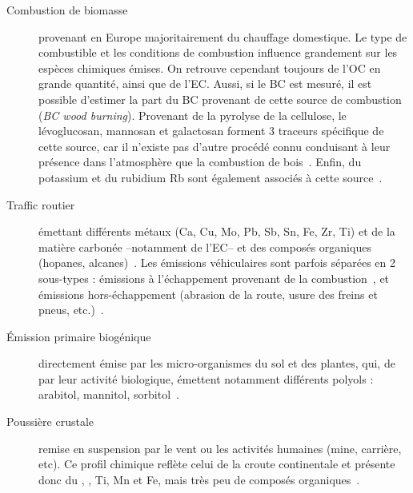 \begin{description}
    \item[Combustion de biomasse] provenant en Europe majoritairement du chauffage
        domestique. Le type de combustible et les conditions de combustion influence
        grandement sur les espèces chimiques émises. On retrouve cependant toujours de
        l'OC en grande quantité, ainsi que de l'EC. Aussi, si le BC est mesuré, il est
        possible d'estimer la part du BC provenant de cette source de combustion \BCwb{}
        (\textit{BC wood burning}).
        Provenant de la pyrolyse de la cellulose, le lévoglucosan, mannosan et
        galactosan forment 3 traceurs spécifique de cette source, car il n'existe pas d'autre
        procédé connu conduisant à leur présence dans l'atmosphère que la combustion de
        bois~\autocite{jordanLevoglucosan2006,puxbaumLevoglucosan2007}.
        Enfin, du potassium  et du rubidium Rb sont également associés à cette
        source~\autocite{navaBiomass2015,gollyEtude2014,chevrierChauffage2016}.

    \item[Traffic routier] émettant différents métaux (Ca, Cu, Mo, Pb, Sb, Sn, Fe, Zr,
        Ti) et de la matière carbonée --notamment de l'EC-- et des composés organiques
        (hopanes, alcanes)~\autocite{schauerCharacterization2006,charronIdentification2019}. Les émissions
        véhiculaires sont parfois séparées en 2 sous-types : émissions à l'échappement
        provenant de la combustion~\autocite{allenSize2001,huMetals2009,vianaSource2008},
        et émissions hors-échappement (abrasion de la route, usure des freins et pneus,
        etc.)~\autocite{grigoratosBrake2015,sandersAirborne2003,sternbeckMetal2002}.

    \item[Émission primaire biogénique] directement émise par les micro-organismes du sol
        et des plantes, qui, de par leur activité biologique, émettent notamment
        différents polyols : arabitol, mannitol,
        sorbitol~\autocite{bauerSignificant2008,yttriAmbient2007,samakePolyols2019}.

    \item[Poussière crustale] remise en suspension par le vent ou les activités humaines
        (mine, carrière, etc). Ce profil chimique reflète celui de la croute continentale
        et présente donc du , , Ti, Mn et Fe, mais très peu de composés
        organiques~\autocite{almeidaSource2005,dallostoHourly2013,morenoVariations2011,putaudSizesegregated2004}.


\end{description}
